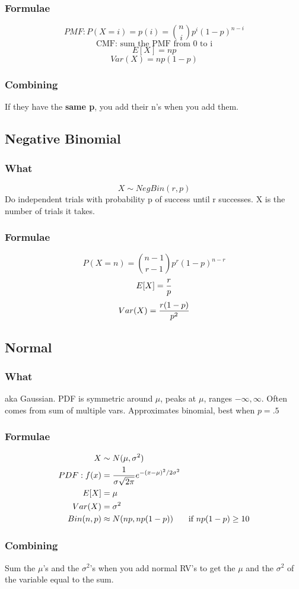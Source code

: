 \documentclass[12pt]{amsart}
\begin{document}
\subsubsection{Formulae}
\[
PMF: P(X = i) = p(i) = {n \choose i} p^i (1-p)^{n-i}
\]
\[
\text{CMF: sum the PMF from 0 to i}
\]
\[
E[X] = np
\]
\[
Var(X) = np(1-p)
\]
\subsubsection{Combining}
If they have the \textbf{same p}, you add their n's when you add them.
%
\subsection{Negative Binomial}
\subsubsection{What}
\[
X \sim NegBin(r, p)
\]
Do independent trials with probability p of success until r successes. X is the number of trials it takes.
\subsubsection{Formulae}
\[
P(X = n) = {n - 1 \choose r - 1} p^r (1-p)^{n-r}
\]
\[
E[X] = {r \over p}
\]
\[
Var(X) = {r(1-p) \over p^2}
\]
%
\subsection{Normal}
\subsubsection{What}
aka Gaussian. PDF is symmetric around $\mu$, peaks at $\mu$, ranges $-\infty, \infty$. Often comes from sum of multiple vars. Approximates binomial, best when $p = .5$
\subsubsection{Formulae}
\begin{align*}
X &\sim N(\mu, \sigma^2) \\
PDF: f(x) &= {1 \over \sigma \sqrt{2\pi}} e^{-(x-\mu)^2 / 2 \sigma^2} \\
E[X] &= \mu \\
Var(X) &= \sigma^2 \\
Bin(n, p) &\approx N(np, np(1-p)) & \text{if } np(1-p) \geq 10
\end{align*}
\subsubsection{Combining}
Sum the $\mu$'s and the $\sigma^2$'s when you add normal RV's to get the $\mu$ and the $\sigma^2$ of the variable equal to the sum.
%
\end{document}
